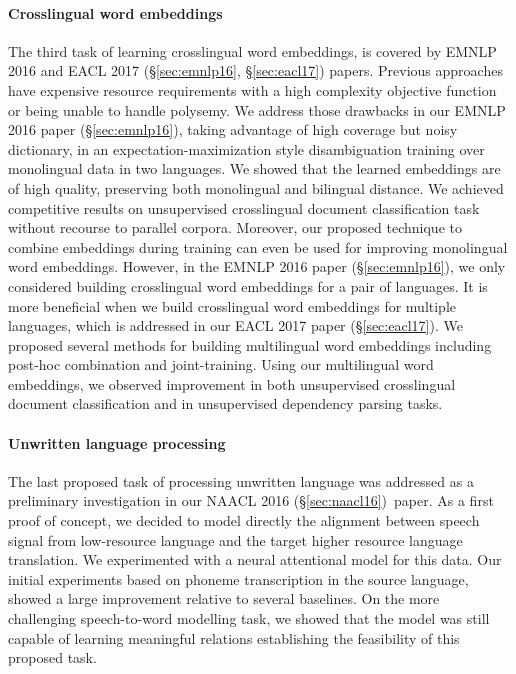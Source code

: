 \documentclass[12pt,twoside,final,hidelinks]{ltthesis}
\theoremstyle{definition}
\newcommand\naaclvi{NAACL 2016 (\S\ref{sec:naacl16})}
\newcommand\emnlpvip{EMNLP 2016 paper (\S\ref{sec:emnlp16})}
\newcommand\eaclviip{EACL 2017 paper (\S\ref{sec:eacl17})}
\begin{document}
\paragraph{Crosslingual word embeddings}The third task of learning crosslingual word embeddings, is covered by EMNLP 2016 and EACL 2017 (\S\ref{sec:emnlp16}, \S\ref{sec:eacl17}) papers. Previous approaches have expensive resource requirements with a 
high complexity objective function or being unable to handle polysemy. We address those drawbacks in our \emnlpvip, taking advantage of high 
coverage but noisy dictionary, in an expectation-maximization style disambiguation training over monolingual data in two languages. We showed that the 
learned embeddings are of high quality, preserving both monolingual and bilingual distance. We achieved competitive results on unsupervised crosslingual 
document classification task without recourse to parallel corpora. Moreover, our proposed technique to combine embeddings during training can even be used for 
improving monolingual word embeddings. However, in the \emnlpvip, we only considered building crosslingual word embeddings for a pair of languages. 
It is more beneficial when we build crosslingual word embeddings for multiple languages, which is addressed in our \eaclviip. We proposed
several methods for building multilingual word embeddings including post-hoc combination and joint-training. Using our multilingual word embeddings, we observed improvement in both unsupervised crosslingual document classification and in unsupervised dependency parsing tasks. 

\paragraph{Unwritten language processing}The last proposed task of processing unwritten language was addressed as a preliminary investigation in our \naaclvi\ paper. As a first proof of concept, we decided 
to model directly the alignment between speech signal from low-resource language and the target higher resource language translation. We experimented with a neural attentional model 
for this data. Our initial experiments based on phoneme transcription in the source language, showed a large improvement relative to several 
baselines. On the more challenging speech-to-word modelling task, we showed that the model was still capable of learning meaningful relations establishing the feasibility of this proposed task. 
\end{document}
